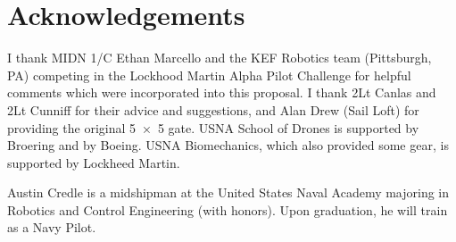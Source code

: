 \documentclass[onecolumn,10pt]{IEEEtran}
\newcommand{\myroot}{../}
\begin{document}
\section*{Acknowledgements}
I thank MIDN 1/C Ethan Marcello and the KEF Robotics team (Pittsburgh, PA) competing in the Lockhood Martin Alpha Pilot Challenge for helpful comments which were incorporated into this proposal. I thank 2Lt Canlas and 2Lt Cunniff for their advice and suggestions, and Alan Drew (Sail Loft) for providing the original \SI{5x5}{\foot} gate. USNA School of Drones is supported by Broering and by Boeing.  USNA Biomechanics, which also provided some gear, is supported by Lockheed Martin. 




\begin{IEEEbiography}{Austin Credle} is a midshipman at the United States Naval Academy majoring in Robotics and Control Engineering (with honors). Upon graduation, he will train as a Navy Pilot. 
\end{IEEEbiography}
%

%
\end{document}
